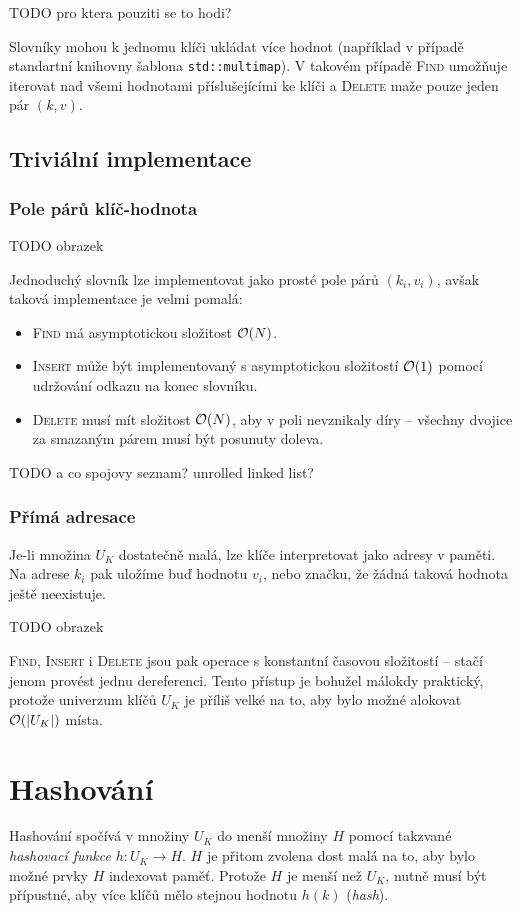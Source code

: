 \documentclass[a4paper]{article}
\begin{document}
TODO pro ktera pouziti se to hodi?

Slovníky mohou k jednomu klíči ukládat více hodnot (například v případě
standartní knihovny \Cpp šablona \texttt{std::multimap}). V takovém případě
\textsc{Find} umožňuje iterovat nad všemi hodnotami příslušejícími ke klíči a
\textsc{Delete} maže pouze jeden pár $(k,v)$.

\subsection{Triviální implementace}
\subsubsection{Pole párů klíč-hodnota}
TODO obrazek

Jednoduchý slovník lze implementovat jako prosté pole párů $(k_i,v_i)$,
avšak taková implementace je velmi pomalá:
\begin{itemize}
\item \textsc{Find}
	má asymptotickou složitost $\mathcal{O}(N)$.
\item \textsc{Insert}
	může být implementovaný s asymptotickou složitostí $\mathcal{O}(1)$
	pomocí udržování odkazu na konec slovníku.
\item \textsc{Delete}
	musí mít složitost $\mathcal{O}(N)$, aby v poli nevznikaly díry --
	všechny dvojice za smazaným párem musí být posunuty doleva.
\end{itemize}

TODO a co spojovy seznam? unrolled linked list?

\subsubsection{Přímá adresace}
Je-li množina $U_K$ dostatečně malá, lze klíče interpretovat jako
adresy v paměti. Na adrese $k_i$ pak uložíme buď hodnotu $v_i$, nebo
značku, že žádná taková hodnota ještě neexistuje.

TODO obrazek

\textsc{Find}, \textsc{Insert} i \textsc{Delete} jsou pak operace s konstantní
časovou složitostí -- stačí jenom provést jednu dereferenci.
Tento přístup je bohužel málokdy praktický, protože univerzum klíčů $U_K$
je příliš velké na to, aby bylo možné alokovat $\mathcal{O}(|U_K|)$ místa.

\section{Hashování}
Hashování spočívá v  množiny $U_K$ do menší množiny $H$ pomocí
takzvané \textit{hashovací funkce} $h: U_K\rightarrow H$.
$H$ je přitom zvolena dost malá na to, aby bylo možné prvky $H$ indexovat
paměť. Protože $H$ je menší než $U_K$, nutně musí být přípustné, aby
více klíčů mělo stejnou hodnotu $h(k)$ (\textit{hash}).
\end{document}
